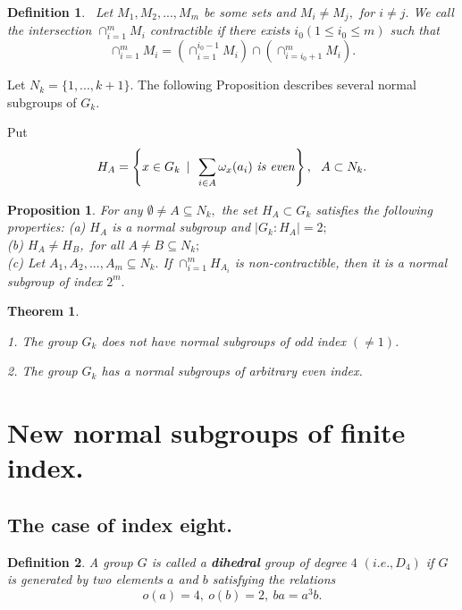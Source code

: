 \documentclass[12pt,reqno]{amsart}
\newtheorem{thm}{Theorem}
\newtheorem{defn}{Definition}
\newtheorem{pro}{Proposition}
\numberwithin{equation}{section}
\begin{document}
\begin{defn}\label{d0}\ Let $M_{1}, M_{2},..., M_{m}$ be some sets and
$M_{i}\neq M_{j},$ for $i\neq j.$ We call the intersection
$\cap_{i=1}^{m}M_{i}$ contractible if there exists $i_{0} (1\leq
i_{0}\leq m)$ such that
 $$\cap_{i=1}^{m}M_{i}=\left(\cap_{i=1}^{i_{0}-1}M_{i}\right)\cap\left(\cap_{i=i_{0}+1}^{m}M_{i}\right).$$
\end{defn}

  Let $N_{k}=\{1,...,k+1\}.$ The following Proposition describes
  several normal subgroups of $G_{k}.$

Put \begin{equation} H_{A}=\left\{x\in G_{k}\,\ | \,\ \sum_{i\in
A}\omega_{x}(a_{i}) \ {\it is \ even} \right\},\ \ A\subset N_{k}.
\end{equation}

\begin{pro}\label{p2} \cite{5} For any $\emptyset \neq A \subseteq
  N_{k},$ the set $H_{A}\subset G_{k}$ satisfies the
  following properties:
 (a) $H_{A}$ is a normal subgroup and $|G_{k}:H_{A}|=2;$\\
 (b) $H_{A}\neq H_{B}$,\ for all $A\neq B \subseteq N_{k};$\\
 (c) Let $A_{1}, A_{2},...,A_{m}\subseteq N_{k}.$ If $\cap_{i=1}^{m}H_{A_{i}}$ is non-contractible, then it is
 a  normal subgroup of index $2^{m}.$\end{pro}

\begin{thm}\label{th0} \cite{5}

\item 1. The group $G_{k}$ does not have normal subgroups of odd
index $(\neq 1)$.

\item 2. The group $G_{k}$ has a normal subgroups of arbitrary even
index.

\end{thm}
\section{New normal subgroups of finite index.}

\subsection{The case of index eight.}
\begin{defn}\label{d1} A group $G$ is called a \textbf{dihedral}
group of degree $4$ $(i.e.,D_{4})$ if $G$ is generated by two
elements $a$ and $b$ satisfying the relations
$$o(a)=4, \ o(b)=2, \ ba=a^{3}b.$$
\end{defn}
\end{document}

